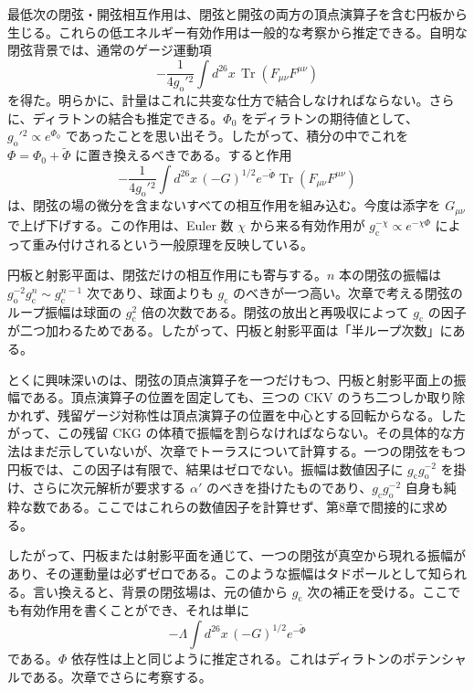 
最低次の閉弦・開弦相互作用は、閉弦と開弦の両方の頂点演算子を含む円板から生じる。これらの低エネルギー有効作用は一般的な考察から推定できる。自明な閉弦背景では、通常のゲージ運動項
\begin{equation}
-\frac1{4g_{\mathrm o}'{}^2}
\int d^{26}x\,\operatorname{Tr}(F_{\mu\nu}F^{\mu\nu})
\tag{6.6.26}\label{eq:6.6.26}
\end{equation}
を得た。明らかに、計量はこれに共変な仕方で結合しなければならない。さらに、ディラトンの結合も推定できる。$\Phi_0$ をディラトンの期待値として、$g_{\mathrm o}'{}^2\propto e^{\Phi_0}$ であったことを思い出そう。したがって、積分の中でこれを $\Phi=\Phi_0+\widetilde\Phi$ に置き換えるべきである。すると作用
\begin{equation}
-\frac1{4g_{\mathrm o}'{}^2}
\int d^{26}x\,(-G)^{1/2}e^{-\widetilde\Phi}
\operatorname{Tr}(F_{\mu\nu}F^{\mu\nu})
\tag{6.6.27}\label{eq:6.6.27}
\end{equation}
は、閉弦の場の微分を含まないすべての相互作用を組み込む。今度は添字を $G_{\mu\nu}$ で上げ下げする。この作用は、Euler 数 $\chi$ から来る有効作用が $g_{\mathrm c}^{-\chi}\propto e^{-\chi\Phi}$ によって重み付けされるという一般原理を反映している。

円板と射影平面は、閉弦だけの相互作用にも寄与する。$n$ 本の閉弦の振幅は $g_{\mathrm o}^{-2}g_{\mathrm c}^n\sim g_{\mathrm c}^{n-1}$ 次であり、球面よりも $g_{\mathrm c}$ のべきが一つ高い。次章で考える閉弦のループ振幅は球面の $g_{\mathrm c}^2$ 倍の次数である。閉弦の放出と再吸収によって $g_{\mathrm c}$ の因子が二つ加わるためである。したがって、円板と射影平面は「半ループ次数」にある。

とくに興味深いのは、閉弦の頂点演算子を一つだけもつ、円板と射影平面上の振幅である。頂点演算子の位置を固定しても、三つの CKV のうち二つしか取り除かれず、残留ゲージ対称性は頂点演算子の位置を中心とする回転からなる。したがって、この残留 CKG の体積で振幅を割らなければならない。その具体的な方法はまだ示していないが、次章でトーラスについて計算する。一つの閉弦をもつ円板では、この因子は有限で、結果はゼロでない。振幅は数値因子に $g_{\mathrm c}g_{\mathrm o}^{-2}$ を掛け、さらに次元解析が要求する $\alpha'$ のべきを掛けたものであり、$g_{\mathrm c}g_{\mathrm o}^{-2}$ 自身も純粋な数である。ここではこれらの数値因子を計算せず、第8章で間接的に求める。

したがって、円板または射影平面を通じて、一つの閉弦が真空から現れる振幅があり、その運動量は必ずゼロである。このような振幅はタドポールとして知られる。言い換えると、背景の閉弦場は、元の値から $g_{\mathrm c}$ 次の補正を受ける。ここでも有効作用を書くことができ、それは単に
\begin{equation}
-\Lambda\int d^{26}x\,(-G)^{1/2}e^{-\widetilde\Phi}
\tag{6.6.28}\label{eq:6.6.28}
\end{equation}
である。$\Phi$ 依存性は上と同じように推定される。これはディラトンのポテンシャルである。次章でさらに考察する。

